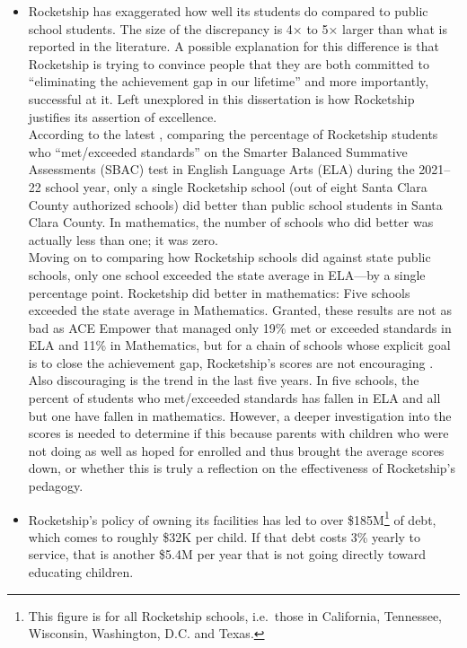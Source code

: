 \begin{enumerate}
\begin{itemize}
    \item Rocketship has exaggerated how well its students do compared to public school students. The size of the discrepancy is 4× to 5× larger than what is reported in the literature. A possible explanation for this difference is that Rocketship is trying to convince people that they are both committed to ``eliminating the achievement gap in our lifetime'' and more importantly, successful at it. Left unexplored in this dissertation is how Rocketship justifies its assertion of excellence.\\
    According to the latest , comparing the percentage of Rocketship students who ``met/exceeded standards'' on the Smarter Balanced Summative Assessments (SBAC) test in English Language Arts (ELA) during the 2021–22 school year, only a single Rocketship school (out of eight Santa Clara County authorized schools) did better than public school students in Santa Clara County. In mathematics, the number of schools who did better was actually less than one; it was zero.\\
    Moving on to comparing how Rocketship schools did against state public schools, only one school exceeded the state average in ELA—by a single percentage point. Rocketship did better in mathematics: Five schools exceeded the state average in Mathematics. Granted, these results are not as bad as ACE Empower that managed only 19\% met or exceeded standards in ELA and 11\% in Mathematics, but for a chain of schools whose explicit goal is to close the achievement gap, Rocketship's scores are not encouraging \parencite{SCCOE2023}.\\
    Also discouraging is the trend in the last five years. In five schools, the percent of students who met/exceeded standards has fallen in ELA and all but one have fallen in mathematics. However, a deeper investigation into the scores is needed to determine if this because parents with children who were not doing as well as hoped for enrolled and thus brought the average scores down, or whether this is truly a reflection on the effectiveness of Rocketship's pedagogy.

    \item Rocketship's policy of owning its facilities has led to over \$185M\footnote{This figure is for all Rocketship schools, i.e.\ those in  California, Tennessee, Wisconsin, Washington, D.C. and Texas.} of debt, which comes to roughly \$32K per child. If that debt costs 3\% yearly to service, that is another \$5.4M per year that is not going directly toward educating children.
  \end{itemize}
\end{enumerate}

